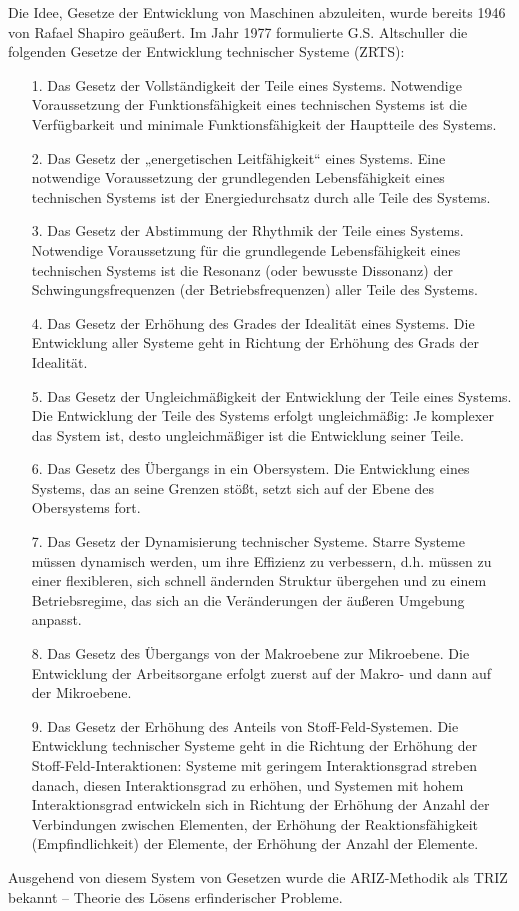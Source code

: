 \documentclass[11pt,a4paper]{article}
\begin{document}
Die Idee, Gesetze der Entwicklung von Maschinen abzuleiten, wurde bereits 1946
von Rafael Shapiro geäußert. Im Jahr 1977 formulierte G.S. Altschuller die
folgenden Gesetze der Entwicklung technischer Systeme (ZRTS):
\begin{itemize}
\item[1.] Das Gesetz der Vollständigkeit der Teile eines Systems. Notwendige
  Voraussetzung der Funktionsfähigkeit eines technischen Systems ist die
  Verfügbarkeit und minimale Funktionsfähigkeit der Hauptteile des Systems.
\item[2.] Das Gesetz der „energetischen Leitfähigkeit“ eines Systems. Eine
  notwendige Voraussetzung der grundlegenden Lebensfähigkeit eines technischen
  Systems ist der Energiedurchsatz durch alle Teile des Systems.
\item[3.] Das Gesetz der Abstimmung der Rhythmik der Teile eines Systems.
  Notwendige Voraussetzung für die grundlegende Lebensfähigkeit eines
  technischen Systems ist die Resonanz (oder bewusste Dissonanz) der
  Schwingungsfrequenzen (der Betriebsfrequenzen) aller Teile des Systems.
\item[4.] Das Gesetz der Erhöhung des Grades der Idealität eines Systems. Die
  Entwicklung aller Systeme geht in Richtung der Erhöhung des Grads der
  Idealität.
\item[5.] Das Gesetz der Ungleichmäßigkeit der Entwicklung der Teile eines
  Systems.  Die Entwicklung der Teile des Systems erfolgt ungleichmäßig: Je
  komplexer das System ist, desto ungleichmäßiger ist die Entwicklung seiner
  Teile.
\item[6.] Das Gesetz des Übergangs in ein Obersystem. Die Entwicklung eines
  Systems, das an seine Grenzen stößt, setzt sich auf der Ebene des
  Obersystems fort.
\item[7.] Das Gesetz der Dynamisierung technischer Systeme. Starre Systeme
  müssen dynamisch werden, um ihre Effizienz zu verbessern, d.h. müssen zu
  einer flexibleren, sich schnell ändernden Struktur übergehen und zu einem
  Betriebsregime, das sich an die Veränderungen der äußeren Umgebung anpasst.
\item[8.] Das Gesetz des Übergangs von der Makroebene zur Mikroebene. Die
  Entwicklung der Arbeitsorgane erfolgt zuerst auf der Makro- und dann auf der
  Mikroebene.
\item[9.] Das Gesetz der Erhöhung des Anteils von Stoff-Feld-Systemen. Die
  Entwicklung technischer Systeme geht in die Richtung der Erhöhung der
  Stoff-Feld-Interaktionen: Systeme mit geringem Interaktionsgrad streben
  danach, diesen Interaktionsgrad zu erhöhen, und Systemen mit hohem
  Interaktionsgrad entwickeln sich in Richtung der Erhöhung der Anzahl der
  Verbindungen zwischen Elementen, der Erhöhung der Reaktionsfähigkeit
  (Empfindlichkeit) der Elemente, der Erhöhung der Anzahl der Elemente.
\end{itemize}
Ausgehend von diesem System von Gesetzen wurde die ARIZ-Methodik als TRIZ
bekannt -- Theorie des Lösens erfinderischer Probleme.
\end{document}
